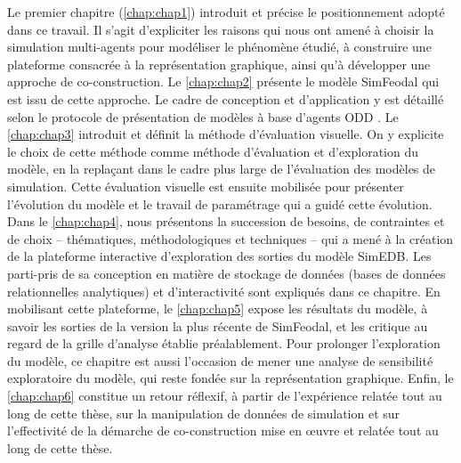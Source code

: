 Le premier chapitre (\cref{chap:chap1}) introduit et précise le positionnement adopté dans ce travail.
Il s'agit d'expliciter les raisons qui nous ont amené à choisir la simulation multi-agents pour modéliser le phénomène étudié, à construire une plateforme consacrée à la représentation graphique, ainsi qu'à développer une approche de co-construction.
Le \cref{chap:chap2} présente le modèle \og SimFeodal\fg{} qui est issu de cette approche. Le cadre de conception et d'application y est détaillé selon le protocole de présentation de modèles à base d'agents \og ODD\fg{} \autocite{grimm_odd_2010}.
Le \cref{chap:chap3} introduit et définit la méthode d'\og{}évaluation visuelle\fg{}.
On y explicite le choix de cette méthode comme méthode d'évaluation et d'exploration du modèle, en la replaçant dans le cadre plus large de l'évaluation des modèles de simulation.
Cette évaluation visuelle est ensuite mobilisée pour présenter l'évolution du modèle et le travail de \og paramétrage\fg{} qui a guidé cette évolution.
Dans le \cref{chap:chap4}, nous présentons la succession de besoins, de contraintes et de choix -- thématiques, méthodologiques et techniques -- qui a mené à la création de la plateforme interactive d'exploration des sorties du modèle SimEDB.
Les parti-pris de sa conception en matière de stockage de données (bases de données relationnelles analytiques) et d'interactivité sont expliqués dans ce chapitre.
En mobilisant cette plateforme, le \cref{chap:chap5} expose les résultats du modèle, à savoir les sorties de la version la plus récente de SimFeodal, et les critique au regard de la grille d'analyse établie préalablement.
Pour prolonger l'exploration du modèle, ce chapitre est aussi l'occasion de mener une analyse de sensibilité exploratoire du modèle, qui reste fondée sur la représentation graphique.
Enfin, le \cref{chap:chap6} constitue un retour réflexif, à partir de l'expérience relatée tout au long de cette thèse, sur la manipulation de données de simulation et sur l'effectivité de la démarche de co-construction mise en œuvre et relatée tout au long de cette thèse.


\clearpage
\FancyChapter